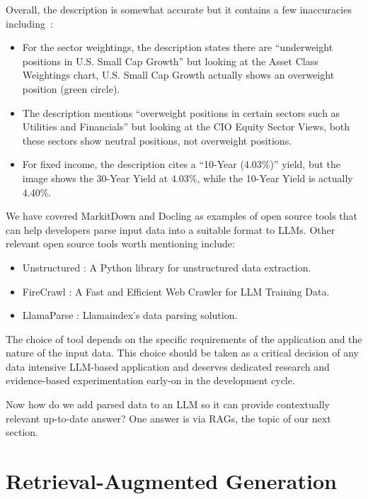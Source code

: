 Overall, the description is somewhat accurate but it contains a few inaccuracies including~:

\begin{itemize}
    \item For the sector weightings, the description states there are ``underweight positions in U.S. Small Cap Growth'' but looking at the Asset Class Weightings chart, U.S. Small Cap Growth actually shows an overweight position (green circle).
    \item The description mentions ``overweight positions in certain sectors such as Utilities and Financials'' but looking at the CIO Equity Sector Views, both these sectors show neutral positions, not overweight positions.
    \item For fixed income, the description cites a ``10-Year (4.03\%)'' yield, but the image shows the 30-Year Yield at 4.03\%, while the 10-Year Yield is actually 4.40\%.
\end{itemize}

We have covered MarkitDown and Docling as examples of open source tools that can help developers parse input data into a suitable format to LLMs. Other relevant open source tools worth mentioning include:
\begin{itemize}
    \item Unstructured : A Python library for unstructured data extraction.
    \item FireCrawl : A Fast and Efficient Web Crawler for LLM Training Data.
    \item LlamaParse : Llamaindex's data parsing solution.
\end{itemize}

The choice of tool depends on the specific requirements of the application and the nature of the input data. This choice should be taken as a critical decision of any data intensive LLM-based application and deserves dedicated research and evidence-based experimentation early-on in the development cycle.

Now how do we add parsed data to an LLM so it can provide contextually relevant up-to-date answer? One answer is via RAGs, the topic of our next section.

\section{Retrieval-Augmented Generation}

